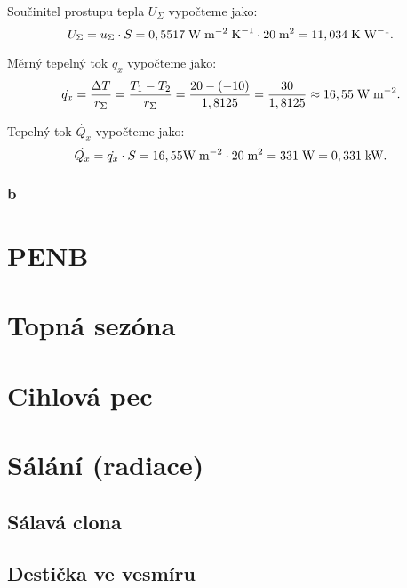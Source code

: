 \documentclass{article}
\begin{document}
Součinitel prostupu tepla $U_{\Sigma}$ vypočteme jako:
$$
    U_{\Sigma} = u_{\Sigma} \cdot S = 0,5517 \; \textrm{W} \; \textrm{m}^{-2} \; \textrm{K}^{-1} \cdot 20 \; \textrm{m}^{\textrm{2}} = 11,034 \; \textrm{K} \; \textrm{W}^{-1}.
$$

Měrný tepelný tok $\dot{q_x}$ vypočteme jako:
$$
    \dot{q_x} = \frac{\Delta T}{r_{\Sigma}} = \frac{T_1 - T_2}{r_{\Sigma}} = \frac{20 - (-10)}{1,8125} = \frac{30}{1,8125} \approx 16,55 \; \textrm{W} \; \textrm{m}^{-2}.
$$

Tepelný tok $\dot{Q_x}$ vypočteme jako:
$$
    \dot{Q_x} = \dot{q_x} \cdot S = 16,55 \textrm{W} \; \textrm{m}^{-2} \cdot 20 \; \textrm{m}^{\textrm{2}} = 331 \; \textrm{W} = 0,331 \; \textrm{kW}.
$$


\subsubsection{b}







\newpage



\section{ PENB \spicy \spicy}

\newpage



\section{ Topná sezóna \spicy \spicy \spicy}

\newpage



\section{ Cihlová pec \spicy \spicy \spicy \spicy}

\newpage



\section{ Sálání (radiace) \spicy \spicy}


\subsection{Sálavá clona}


\subsection{Destička ve vesmíru}
\end{document}
